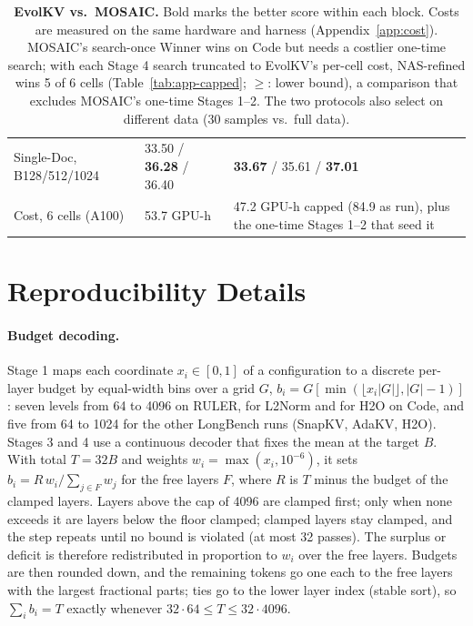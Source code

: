 \begin{table}[t]
\begin{tabular}{@{} p{} p{} p{} @{}}
    Single-Doc, B128/512/1024 & 33.50 / \textbf{36.28} / 36.40 & \textbf{33.67} / 35.61 / \textbf{37.01} \\
    Cost, 6 cells (A100) & 53.7 GPU-h & 47.2 GPU-h capped (84.9 as run), plus the one-time Stages 1--2 that seed it \\
    \bottomrule
  \end{tabular}
  \caption{\textbf{EvolKV vs.\ MOSAIC.} Bold marks the better score within each block. Costs are measured on the same hardware and harness (Appendix~\ref{app:cost}). MOSAIC's search-once Winner wins on Code but needs a costlier one-time search; with each Stage 4 search truncated to EvolKV's per-cell cost, NAS-refined wins 5 of 6 cells (Table~\ref{tab:app-capped}; $\geq$: lower bound), a comparison that excludes MOSAIC's one-time Stages 1--2. The two protocols also select on different data (30 samples vs.\ full data).}
  \label{tab:app-evolkv-glance}
\end{table}


\section{Reproducibility Details}
\label{app:repro}

\paragraph{Budget decoding.} Stage 1 maps each coordinate $x_i \in [0,1]$ of a configuration to a discrete per-layer budget by equal-width bins over a grid $G$, $b_i = G[\min(\lfloor x_i |G| \rfloor, |G|-1)]$: seven levels from 64 to 4096 on RULER, for L2Norm and for H2O on Code, and five from 64 to 1024 for the other LongBench runs (SnapKV, AdaKV, H2O). Stages 3 and 4 use a continuous decoder that fixes the mean at the target $B$. With total $T = 32B$ and weights $w_i = \max(x_i, 10^{-6})$, it sets $b_i = R\,w_i / \sum_{j \in F} w_j$ for the free layers $F$, where $R$ is $T$ minus the budget of the clamped layers. Layers above the cap of 4096 are clamped first; only when none exceeds it are layers below the floor clamped; clamped layers stay clamped, and the step repeats until no bound is violated (at most 32 passes). The surplus or deficit is therefore redistributed in proportion to $w_i$ over the free layers. Budgets are then rounded down, and the remaining tokens go one each to the free layers with the largest fractional parts; ties go to the lower layer index (stable sort), so $\sum_i b_i = T$ exactly whenever $32 \cdot 64 \le T \le 32 \cdot 4096$.

